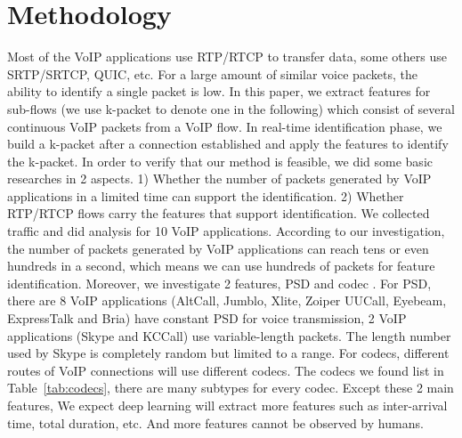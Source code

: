 \documentclass[conference]{IEEEtran}
\begin{document}

\section{Methodology}
\label{sec:methodology}

Most of the VoIP applications use RTP/RTCP to transfer data, some others use SRTP/SRTCP, QUIC, etc. For a large amount of similar voice packets, the ability to identify a single packet is low. In this paper, we extract features for sub-flows (we use k-packet to denote one in the following) which consist of several continuous VoIP packets from a VoIP flow. In real-time identification phase, we build a k-packet after a connection established and apply the features to identify the k-packet. In order to verify that our method is feasible, we did some basic researches in 2 aspects. 1) Whether the number of packets generated by VoIP applications in a limited time can support the identification. 2) Whether RTP/RTCP flows carry the features that support identification. We collected traffic and did analysis for 10 VoIP applications. According to our investigation, the number of packets generated by VoIP applications can reach tens or even hundreds in a second, which means we can use hundreds of packets for feature identification. Moreover, we investigate 2 features, PSD \cite{22} and codec \cite{4}. For PSD, there are 8 VoIP applications (AltCall, Jumblo, Xlite, Zoiper UUCall, Eyebeam, ExpressTalk and Bria) have constant PSD for voice transmission, 2 VoIP applications (Skype and KCCall) use variable-length packets. The length number used by Skype is completely random but limited to a range. For codecs, different routes of VoIP connections will use different codecs. The codecs we found list in Table~\ref{tab:codecs}, there are many subtypes for every codec. Except these 2 main features, We expect deep learning will extract more features such as inter-arrival time, total duration, etc. And more features cannot be observed by humans.
\end{document}
